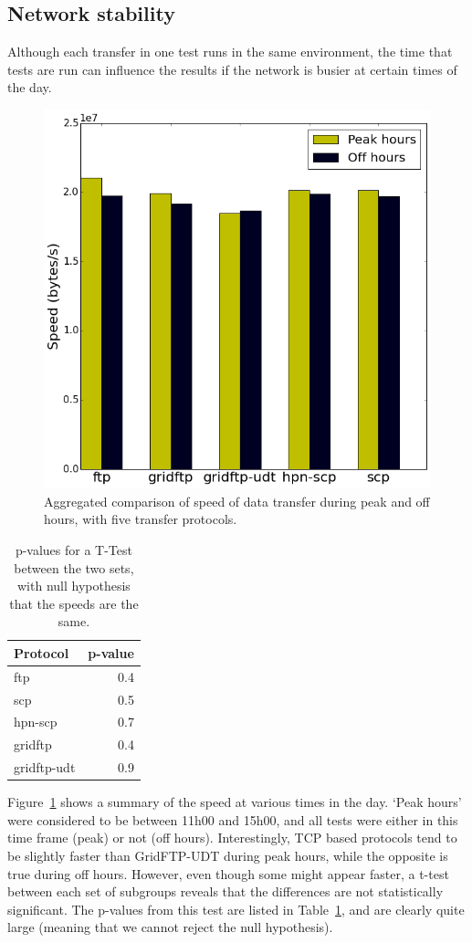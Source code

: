 \documentclass{sig-alternate-05-2015}
\begin{document}
\subsection{Network stability}
Although each transfer in one test runs in the same environment, the time that tests are run can influence the results if the network is busier at certain times of the day.

\begin{figure}[h]
\centering
\includegraphics[width=.8\linewidth]{img/peak.png}
\caption{Aggregated comparison of speed of data transfer during peak and off hours, with five transfer protocols.}
\label{fig:peak}
\end{figure}

\begin{table}[h]
\centering
	\begin{tabular}{lr}
	\toprule
	Protocol &  p-value \\
	\midrule
	ftp         &      0.4 \\
	scp         &      0.5 \\
	hpn-scp     &      0.7 \\
	gridftp     &      0.4 \\
	gridftp-udt &      0.9 \\
	\bottomrule
	\end{tabular}
\caption{p-values for a T-Test between the two sets, with null hypothesis that the speeds are the same.}
\label{tab:pval}
\end{table}

Figure~\ref{fig:peak} shows a summary of the speed at various times in the day. `Peak hours' were considered to be between 11h00 and 15h00, and all tests were either in this time frame (peak) or not (off hours). Interestingly, TCP based protocols tend to be slightly faster than GridFTP-UDT during peak hours, while the opposite is true during off hours. However, even though some might appear faster, a t-test between each set of subgroups reveals that the differences are not statistically significant. The p-values from this test are listed in Table~\ref{tab:pval}, and are clearly quite large (meaning that we cannot reject the null hypothesis).
\end{document}
